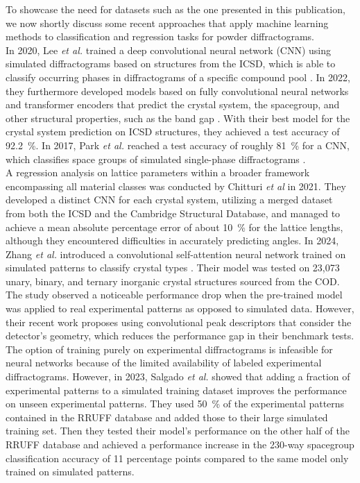 To showcase the need for datasets such as the one presented in this publication, we now shortly discuss some recent
approaches that apply machine learning methods to classification and regression tasks for powder diffractograms. \\

In 2020, Lee {\it et al.} trained a deep convolutional neural network (CNN) using simulated diffractograms based on structures from the ICSD, which is able to classify occurring phases in diffractograms of a specific compound pool \cite{Lee2020}. In 2022, they furthermore developed models based on fully convolutional neural networks and transformer encoders that predict the crystal system, the spacegroup, and other structural properties, such as the band gap \cite{Lee2022}. With their best model for the crystal system prediction on ICSD structures, they achieved a test accuracy of \SI{92.2}{\percent}. In 2017, Park {\it et al.} reached a test accuracy of roughly \SI{81}{\percent} for a CNN, which classifies space groups of simulated single-phase diffractograms \cite{Park2017}. \\

A regression analysis on lattice parameters within a broader framework encompassing all material classes was conducted by Chitturi {\it et al} \cite{Chitturi2021} in 2021. They developed a distinct CNN for each crystal system, utilizing a merged dataset from both the ICSD and the Cambridge Structural Database, and managed to achieve a mean absolute percentage error of about \SI{10}{\percent} for the lattice lengths, although they encountered difficulties in accurately predicting angles.
In 2024, Zhang {\it et al.} introduced a convolutional self-attention neural network trained on simulated patterns to classify crystal types \cite{zhang2024crystallographic}. Their model was tested on 23,073 unary, binary, and ternary inorganic crystal structures sourced from the COD. The study observed a noticeable performance drop when the pre-trained model was applied to real experimental patterns as opposed to simulated data. However, their recent work \cite{cao2024simxrd} proposes using convolutional peak descriptors that consider the detector's geometry, which reduces the performance gap in their benchmark tests.\\

The option of training purely on experimental diffractograms is infeasible for neural networks because of the limited availability of labeled experimental diffractograms. However, in 2023, Salgado {\it et al.} \cite{Salgado2023} showed that adding a fraction of experimental patterns to a simulated training dataset improves the performance on unseen experimental patterns. They used \SI{50}{\percent} of the experimental patterns contained in the RRUFF database and added those to their large simulated training set. Then they tested their model's performance on the other half of the RRUFF database and achieved a performance increase in the 230-way spacegroup classification accuracy of \num{11} percentage points compared to the same model only trained on simulated patterns. \\


